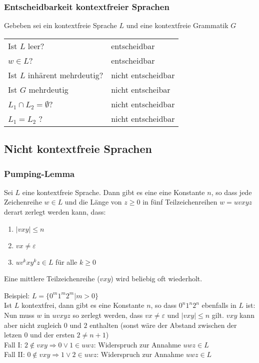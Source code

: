 \subsubsection{Entscheidbarkeit kontextfreier Sprachen}
Gebeben sei ein kontextfreie Sprache $L$ und eine kontextfreie Grammatik $G$
\settowidth{\MyLenA}{Ist $L$ inhärent mehrdeutig?~~}
\begin{tabular}{@{}p{\the\MyLenA}%
				@{}p{\linewidth-\the\MyLenA}}
	Ist $L$ leer? & entscheidbar\\
	$w \in L$? & entscheidbar\\
	Ist $L$ inhärent mehrdeutig? & nicht entscheidbar\\
	Ist $G$ mehrdeutig & nicht entscheibar\\
	$L_1 \cap L_2 = \emptyset$? & nicht entscheidbar\\
	$L_1 = L_2$ ? & nicht entscheidbar\\
\end{tabular}

\subsection{Nicht kontextfreie Sprachen}
\subsubsection{Pumping-Lemma}
Sei $L$ eine kontextfreie Sprache. Dann gibt es eine eine Konstante $n$, so dass jede Zeichenreihe $w \in L$ und die Länge von $z \geq 0$ in fünf Teilzeichenreihen $w = uvxyz$ derart zerlegt werden kann, dass:
\begin{enumerate}\itemsep0em
	\item $|vxy| \leq n$
	\item $vx \neq \varepsilon$
	\item $uv^kxy^kz \in L$ für alle $k \geq 0$
\end{enumerate}
Eine mittlere Teilzeichenreihe ($vxy$) wird beliebig oft wiederholt. 

Beispiel: $L = \{0^m1^m2^m | m > 0\}$\\
Ist $L$ kontextfrei, dann gibt es eine Konstante $n$, so dass $0^n1^n2^n$ ebenfalls in $L$ ist:
Nun muss $w$ in $uvxyz$ so zerlegt werden, dass $vx \neq \varepsilon$ und $|vxy| \leq n$ gilt.
$vxy$ kann aber nicht zugleich $0$ und $2$ enthalten (sonst wäre der Abstand zwischen der letzen $0$ und der ersten $2 \neq n + 1$)\\
Fall I: $2 \notin vxy \Rightarrow 0 \vee 1 \in uwz$: Widerspruch zur Annahme $uwz \in L$\\
Fall II: $0 \notin vxy \Rightarrow 1 \vee 2 \in uwz$: Widerspruch zur Annahme $uwz \in L$



